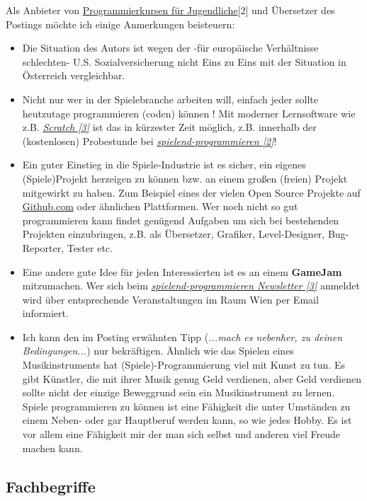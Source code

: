 Als Anbieter von \href{http://spielend-programmieren.at}{Programmierkursen für Jugendliche}[2] und Übersetzer des Postings möchte ich einige Anmerkungen beisteuern:

\begin{itemize}
\item Die Situation des Autors ist wegen der -für europäische Verhältnisse schlechten- U.S. Sozialversicherung nicht Eins zu Eins mit der Situation in Österreich vergleichbar. 
\item Nicht nur wer in der Spielebranche arbeiten will, einfach jeder sollte heutzutage programmieren (coden) können ! Mit moderner Lernsoftware wie z.B. \href{http://scratch.mit.edu}{\textit{Scratch [3]}} ist das in kürzester Zeit möglich, z.B. innerhalb der (kostenlosen) Probestunde bei \href{http://spielend-programmieren.at}{\textit{spielend-programmieren [2]}}! 
\item Ein guter Einstieg in die Spiele-Industrie ist es sicher, ein eigenes (Spiele)Projekt herzeigen zu können bzw. an einem großen (freien) Projekt mitgewirkt zu haben. Zum Beispiel eines der vielen Open Source Projekte auf \href{http://github.com}{Github.com} oder ähnlichen Plattformen. Wer noch nicht so gut programmieren kann findet genügend Aufgaben um sich bei bestehenden Projekten einzubringen, z.B. als Übersetzer, Grafiker, Level-Designer, Bug-Reporter, Tester etc. 
\item Eine andere gute Idee für jeden Interessierten ist es an einem \textbf{GameJam} mitzumachen.  Wer sich beim \href{http://spielend-programmieren.at/de:mailinglist}{\textit{spielend-programmieren Newsletter [3]}} anmeldet wird  über entsprechende Veranstaltungen im Raum Wien per Email informiert.
\item Ich kann den im Posting erwähnten Tipp (\textit{...mach es nebenher, zu deinen Bedingungen...}) nur bekräftigen. Ähnlich wie das Spielen eines Musikinstruments hat (Spiele)-Programmierung viel mit Kunst zu tun. Es gibt Künstler, die mit ihrer Musik genug Geld verdienen, aber Geld verdienen sollte nicht der einzige Beweggrund sein ein Musikinstrument zu lernen. Spiele programmieren zu können ist eine Fähigkeit die unter Umständen zu einem Neben- oder gar Hauptberuf werden kann, so wie jedes Hobby. Es ist vor allem eine Fähigkeit mir der man sich selbst und anderen viel Freude machen kann. 
\end{itemize}


\subsection*{Fachbegriffe}

